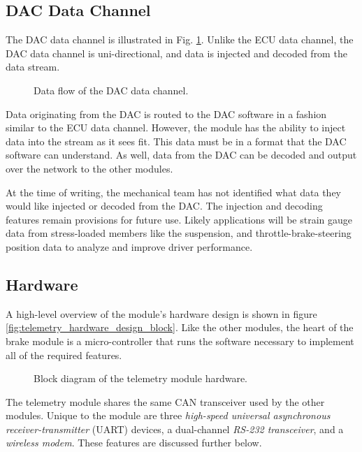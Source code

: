 \subsection{DAC Data Channel}

The DAC data channel is illustrated in Fig. \ref{fig:dac_data_channel}. Unlike the ECU data channel, the DAC data channel is uni-directional, and data is injected and decoded from the data stream.

\begin{figure}[H]
	\centering
	
	\caption{Data flow of the DAC data channel.}
	\label{fig:dac_data_channel}
\end{figure}

Data originating from the DAC is routed to the DAC software in a fashion similar to the ECU data channel. However, the module has the ability to inject data into the stream as it sees fit. This data must be in a format that the DAC software can understand. As well, data from the DAC can be decoded and output over the network to the other modules. 

At the time of writing, the mechanical team has not identified what data they would like injected or decoded from the DAC. The injection and decoding features remain provisions for future use. Likely applications will be strain gauge data from stress-loaded members like the suspension, and throttle-brake-steering position data to analyze and improve driver performance.

\subsection{Hardware}

A high-level overview of the module's hardware design is shown in figure \ref{fig:telemetry_hardware_design_block}. Like the other modules, the heart of the brake module is a micro-controller that runs the software necessary to implement all of the required features. 

\begin{figure}[H]
\centering

\caption{Block diagram of the telemetry module hardware.}
\label{fig:telemetry_hardware_block}
\end{figure}


The telemetry module shares the same CAN transceiver used by the other modules. Unique to the module are three \emph{high-speed universal asynchronous receiver-transmitter} (UART) devices, a dual-channel \emph{RS-232 transceiver}, and a \emph{wireless modem}. These features are discussed further below.

